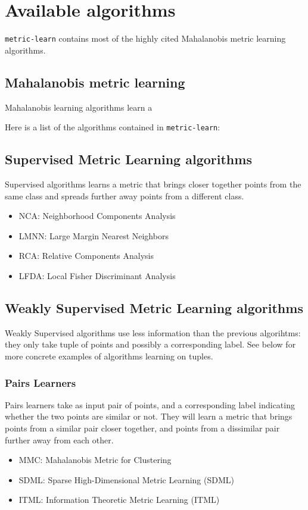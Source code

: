 \documentclass[twoside,11pt]{article}
\begin{document}
\section{Available algorithms}

\texttt{metric-learn} contains most of the highly cited Mahalanobis metric learning algorithms. 

\subsection{Mahalanobis metric learning}
Mahalanobis learning algorithms learn a 


Here is a list of the algorithms contained in \texttt{metric-learn}:
\subsection{Supervised Metric Learning algorithms}
Supervised algorithms learns a metric that brings closer together points from the same class and spreads further away points from a different class.
\begin{itemize}
    \item NCA: Neighborhood Components Analysis
    \item LMNN: Large Margin Nearest Neighbors
    \item RCA: Relative Components Analysis
    \item LFDA: Local Fisher Discriminant Analysis
\end{itemize}
\subsection{Weakly Supervised Metric Learning algorithms}
Weakly Supervised algorithms use less information than the previous algorihtms: they only take tuple of points and possibly a corresponding label. See below for more concrete examples of algorithms learning on tuples.
    \subsubsection{Pairs Learners} 
    Pairs learners take as input pair of points, and a corresponding label indicating whether the two points are similar or not. They will learn a metric that brings points from a similar pair closer together, and points from a dissimilar pair further away from each other.
    \begin{itemize}
        \item MMC: Mahalanobis Metric for Clustering
        \item SDML: Sparse High-Dimensional Metric Learning (SDML)
        \item ITML: Information Theoretic Metric Learning (ITML)
    \end{itemize}
    
\end{document}
